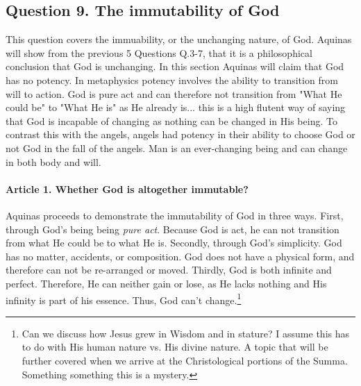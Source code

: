 \documentclass{ucetd}
\begin{document}
\subsection{Question 9. The immutability of God}
This question covers the immuability, or the unchanging nature, of God. Aquinas will show from the previous 5 Questions Q.3-7, that it is a philosophical conclusion that God is unchanging. In this section Aquinas will claim that God has no potency. In metaphysics potency involves the ability to transition from will to action. God is pure act and can therefore not transition from  "What He could be" to "What He is" as He already is... this is a high flutent way of saying that God is incapable of changing as nothing can be changed in His being. To contrast this with the angels, angels had potency in their ability to choose God or not God in the fall of the angels. Man is an ever-changing being and can change in both body and will.

\paragraph{Article 1. Whether God is altogether immutable?}
Aquinas proceeds to demonstrate the immutability of God in three ways. First, through God's being being \textit{pure act}. Because God is act, he can not transition from what He could be to what He is. Secondly, through God's simplicity. God has no matter, accidents, or composition. God does not have a physical form, and therefore can not be re-arranged or moved. Thirdly, God is both infinite and perfect. Therefore, He can neither gain or lose, as He lacks nothing and His infinity is part of his essence. Thus, God can't change.\footnote{Can we discuss how Jesus grew in Wisdom and in stature? I assume this has to do with His human nature vs. His divine nature. A topic that will be further covered when we arrive at the Christological portions of the Summa. Something something this is a mystery.}
\end{document}
